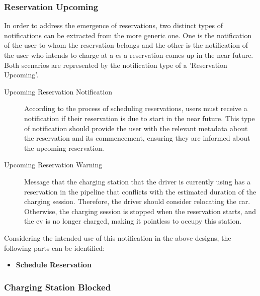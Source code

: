 \subsubsection{Reservation Upcoming}
\label{ch:Design:sec:Reservation System:ssec:Notification Capabilities:sssec:Reservation Upcoming}

In order to address the emergence of reservations, two distinct types of notifications can be extracted from the more generic one. One is the notification of the user to whom the reservation belongs and the other is the notification of the user who intends to charge at a \acrshort{cs} a reservation comes up in the near future. 
Both scenarios are represented by the notification type of a 'Reservation Upcoming'.

\begin{description}
    \item[Upcoming Reservation Notification] According to the process of scheduling reservations, users must receive a notification if their reservation is due to start in the near future. This type of notification should provide the user with the relevant metadata about the reservation and its commencement, ensuring they are informed about the upcoming reservation.
    \item[Upcoming Reservation Warning] Message that the charging station that the driver is currently using has a reservation in the pipeline that conflicts with the estimated duration of the charging session. Therefore, the driver should consider relocating the car. Otherwise, the charging session is stopped when the reservation starts, and the \acrshort{ev} is no longer charged, making it pointless to occupy this station.
\end{description}

\noindent Considering the intended use of this notification in the above designs, the following parts can be identified:
\begin{itemize}
    \item \textbf{Schedule Reservation}
\end{itemize}

\subsubsection{Charging Station Blocked}
\label{ch:Design:sec:Reservation System:ssec:Notification Capabilities:sssec:Charging Station Blocked}

